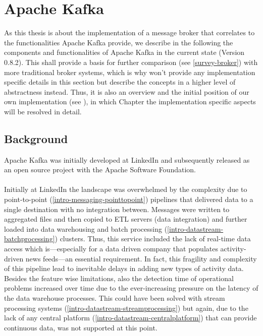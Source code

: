 \chapter{Apache Kafka}
\label{intro-kafka}

As this thesis is about the implementation of a message broker that correlates
to the functionalities Apache Kafka provide, we describe in the following the
components and functionalities of Apache Kafka in the current state (Version
0.8.2). This shall provide a basis for further comparison (see \ref{survey-broker}) with
more traditional broker systems, which is why won't provide any implementation
specific details in this section but describe the concepts in a higher level of
abstractness instead. Thus, it is also an overview and the initial position of our
own implementation (see ), in which Chapter the implementation
specific aspects will be resolved in detail. 

\section{Background}

Apache Kafka was initially developed at LinkedIn\cite{linkedin} and subsequently
released as an open source project with the Apache Software
Foundation\cite{apachefoundation}. 
\\ \\
Initially at LinkedIn the landscape was overwhelmed by the complexity due to
point-to-point (\ref{intro-messaging-pointtopoint})
pipelines that delivered data to a single destination with no
integration between. Messages were written to aggregated files and then copied
to ETL servers (data integration) and further loaded into data warehousing and batch
processing (\ref{intro-datastream-batchprocessing})
clusters. Thus, this service included the lack of real-time data access which
is---especially for a data driven company that populates activity-driven news
feeds---an essential requirement. In fact, this fragility and complexity of this
pipeline lead to inevitable delays in adding new types of activity data.
Besides the feature wise limitations, also the detection time of operational
problems increased over time due to the ever-increasing pressure on the latency
of the data warehouse processes. This could have been solved with
stream processing systems (\ref{intro-datastream-streamprocessing}) but again, 
due to the lack of any central platform (\ref{intro-datastream-centralplatform})
that can provide continuous data, was not supported at this point.
\cite{goodhope2012building}

